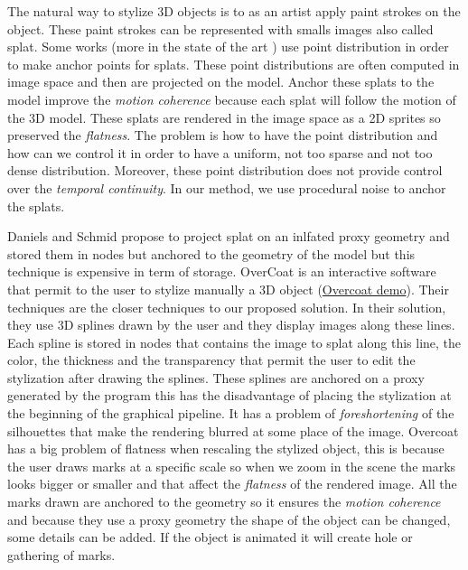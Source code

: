 The natural way to stylize 3D objects is to as an artist apply paint strokes on the object. These paint strokes can be represented with smalls images also called splat. Some works \cite{meier_painterly_1996, Fekete_2000, chi_stylized_2006}(more in the state of the art \cite{benard_state---art_2011}) use point distribution in order to make anchor points for splats. These point distributions are often computed in image space and then are projected on the model. Anchor these splats to the model improve the \textit{motion coherence} because each splat will follow the motion of the 3D model. These splats are rendered in the image space as a 2D sprites so preserved the \textit{flatness}. The problem is how to have the point distribution and how can we control it in order to have a uniform, not too sparse and not too dense distribution. Moreover, these point distribution does not provide control over the \textit{temporal continuity}. In our method, we use procedural noise to anchor the splats.

Daniels\cite{Daniels_1999} and Schmid\cite{schmid_overcoat:_2011} propose to project splat on an inlfated proxy geometry and stored them in nodes but anchored to the geometry of the model but this technique is expensive in term of storage. OverCoat\cite{schmid_overcoat:_2011} is an interactive software that permit to the user to stylize manually a 3D object (\href{https://www.youtube.com/watch?v=Nfw6JxC9Fw4}{Overcoat demo}). Their techniques are the closer techniques to our proposed solution. In their solution, they use 3D splines drawn by the user and they display images along these lines. Each spline is stored in nodes that contains the image to splat along this line, the color, the thickness and the transparency that permit the user to edit the stylization after drawing the splines. These splines are anchored on a proxy generated by the program this has the disadvantage of placing the stylization at the beginning of the graphical pipeline. It has a problem of \textit{foreshortening} of the silhouettes that make the rendering blurred at some place of the image. Overcoat has a big problem of flatness when rescaling the stylized object, this is because the user draws marks at a specific scale so when we zoom in the scene the marks looks bigger or smaller and that affect the \textit{flatness} of the rendered image. All the marks drawn are anchored to the geometry so it ensures the \textit{motion coherence} and because they use a proxy geometry the shape of the object can be changed, some details can be added. If the object is animated it will create hole or gathering of marks.

